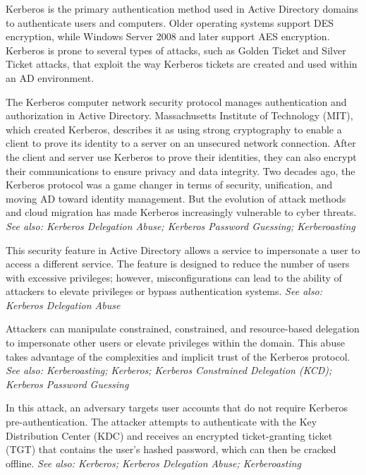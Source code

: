  Kerberos is the primary authentication method used in Active Directory domains to authenticate users and computers. Older operating systems support DES encryption, while Windows Server 2008 and later support AES encryption. Kerberos is prone to several types of attacks, such as Golden Ticket and Silver Ticket attacks, that exploit the way Kerberos tickets are created and used within an AD environment.

The Kerberos computer network security protocol manages authentication and authorization in Active Directory. Massachusetts Institute of Technology (MIT), which created Kerberos, describes it as using strong cryptography to enable a client to prove its identity to a server on an unsecured network connection. After the client and server use Kerberos to prove their identities, they can also encrypt their communications to ensure privacy and data integrity. Two decades ago, the Kerberos protocol was a game changer in terms of security, unification, and moving AD toward identity management. But the evolution of attack methods and cloud migration has made Kerberos increasingly vulnerable to cyber threats.
\textit{See also: Kerberos Delegation Abuse; Kerberos Password Guessing; Kerberoasting}

 This security feature in Active Directory allows a service to impersonate a user to access a different service. The feature is designed to reduce the number of users with excessive privileges; however, misconfigurations can lead to the ability of attackers to elevate privileges or bypass authentication systems.
\textit{See also: Kerberos Delegation Abuse}

 Attackers can manipulate constrained, constrained, and resource-based delegation to impersonate other users or elevate privileges within the domain. This abuse takes advantage of the complexities and implicit trust of the Kerberos protocol.
\textit{See also: Kerberoasting; Kerberos; Kerberos Constrained Delegation (KCD); Kerberos Password Guessing}

 In this attack, an adversary targets user accounts that do not require Kerberos pre-authentication. The attacker attempts to authenticate with the Key Distribution Center (KDC) and receives an encrypted ticket-granting ticket (TGT) that contains the user’s hashed password, which can then be cracked offline.
\textit{See also: Kerberos; Kerberos Delegation Abuse; Kerberoasting}

